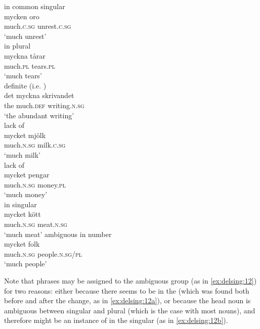 \documentclass[output=paper]{langscibook}
\begin{document}
\ea\label{ex:delsing:10}
\ea\label{ex:delsing:10a} in common  singular\\
\gll mycken        oro\\
    much.\textsc{c.sg}      unrest.\textsc{c.sg}                  \\
    \glt ‘much unrest’\\
\ex\label{ex:delsing:10b} in plural\\
\gll myckna      tårar\\
    much.\textsc{pl}  tears.\textsc{pl}                                \\
    \glt ‘much tears’\\
\ex\label{ex:delsing:10c}definite  (i.e. )\\
\gll det    myckna       skrivandet\\
    the    much.\textsc{def}   writing.\textsc{n.sg}\\
    \glt ‘the abundant writing’\\
\z
\ex\label{ex:delsing:11}
\ea lack of \\\gll mycket      mjölk\\
    much.\textsc{n.sg}      milk.\textsc{c.sg}\\
    \glt ‘much milk’\\
\ex lack of \\
    \gll mycket            pengar\\
    much.\textsc{n.sg}      money.\textsc{pl} \\
    \glt ‘much money’\\
\z
\ex\label{ex:delsing:12}
\ea\label{ex:delsing:12a} in  singular\\
\gll mycket      kött\\
much.\textsc{n.sg}     meat.\textsc{n.sg} \\
    \glt ‘much meat’
\ex \label{ex:delsing:12b}ambiguous in number\\
\gll mycket          folk \\                           
    much.\textsc{n.sg}    people.\textsc{n.sg/pl} \\
    \glt ‘much people’
\z
\z


Note that phrases may be assigned to the ambiguous group (as in \ref{ex:delsing:12}) for two reasons: either because there seems to be  in the  (which was found both before and after the change, as in \ref{ex:delsing:12a}), or because the head noun is ambiguous between singular and plural (which is the case with most  nouns), and therefore might be an instance of   in the singular (as in \ref{ex:delsing:12b}).\largerpage[1.5]
\end{document}
